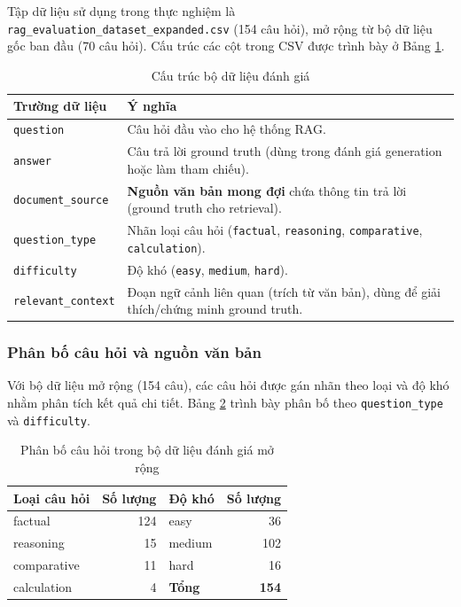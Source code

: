 \documentclass[../DoAn.tex]{subfiles}
\begin{document}
Tập dữ liệu sử dụng trong thực nghiệm là \texttt{rag\_evaluation\_dataset\_expanded.csv} (154 câu hỏi), mở rộng từ bộ dữ liệu gốc ban đầu (70 câu hỏi). Cấu trúc các cột trong CSV được trình bày ở Bảng \ref{tab:eval-dataset-columns}.

\begin{table}[h]
\centering
\begin{tabular}{|p{3.2cm}|p{10.0cm}|}
\hline
\textbf{Trường dữ liệu} & \textbf{Ý nghĩa} \\
\hline
\texttt{question} & Câu hỏi đầu vào cho hệ thống RAG. \\
\hline
\texttt{answer} & Câu trả lời ground truth (dùng trong đánh giá generation hoặc làm tham chiếu). \\
\hline
\texttt{document\_source} & \textbf{Nguồn văn bản mong đợi} chứa thông tin trả lời (ground truth cho retrieval). \\
\hline
\texttt{question\_type} & Nhãn loại câu hỏi (\texttt{factual}, \texttt{reasoning}, \texttt{comparative}, \texttt{calculation}). \\
\hline
\texttt{difficulty} & Độ khó (\texttt{easy}, \texttt{medium}, \texttt{hard}). \\
\hline
\texttt{relevant\_context} & Đoạn ngữ cảnh liên quan (trích từ văn bản), dùng để giải thích/chứng minh ground truth. \\
\hline
\end{tabular}
\caption{Cấu trúc bộ dữ liệu đánh giá}
\label{tab:eval-dataset-columns}
\end{table}

\subsubsection{Phân bố câu hỏi và nguồn văn bản}

Với bộ dữ liệu mở rộng (154 câu), các câu hỏi được gán nhãn theo loại và độ khó nhằm phân tích kết quả chi tiết. Bảng \ref{tab:eval-dataset-distribution} trình bày phân bố theo \texttt{question\_type} và \texttt{difficulty}.

\begin{table}[h]
\centering
\begin{tabular}{|l|r||l|r|}
\hline
\textbf{Loại câu hỏi} & \textbf{Số lượng} & \textbf{Độ khó} & \textbf{Số lượng} \\
\hline
factual & 124 & easy & 36 \\
\hline
reasoning & 15 & medium & 102 \\
\hline
comparative & 11 & hard & 16 \\
\hline
calculation & 4 & \textbf{Tổng} & \textbf{154} \\
\hline
\end{tabular}
\caption{Phân bố câu hỏi trong bộ dữ liệu đánh giá mở rộng}
\label{tab:eval-dataset-distribution}
\end{table}
\end{document}
